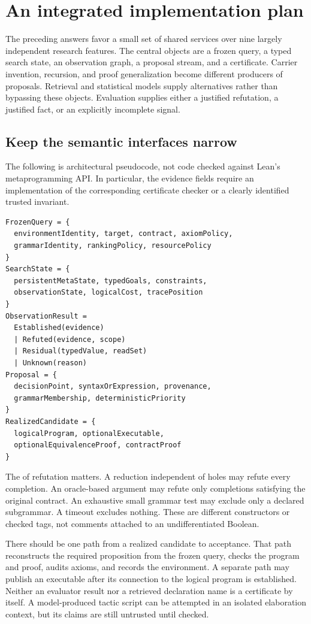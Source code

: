 \section{An integrated implementation plan}
\label{sec:plan}

The preceding answers favor a small set of shared services over nine largely independent research features. The central objects are a frozen query, a typed search state, an observation graph, a proposal stream, and a certificate. Carrier invention, recursion, and proof generalization become different producers of proposals. Retrieval and statistical models supply alternatives rather than bypassing these objects. Evaluation supplies either a justified refutation, a justified fact, or an explicitly incomplete signal.

\subsection{Keep the semantic interfaces narrow}

The following is architectural pseudocode, not code checked against Lean's metaprogramming API. In particular, the evidence fields require an implementation of the corresponding certificate checker or a clearly identified trusted invariant.
\begin{lstlisting}[basicstyle=\footnotesize\ttfamily]
FrozenQuery = {
  environmentIdentity, target, contract, axiomPolicy,
  grammarIdentity, rankingPolicy, resourcePolicy
}
SearchState = {
  persistentMetaState, typedGoals, constraints,
  observationState, logicalCost, tracePosition
}
ObservationResult =
  Established(evidence)
  | Refuted(evidence, scope)
  | Residual(typedValue, readSet)
  | Unknown(reason)
Proposal = {
  decisionPoint, syntaxOrExpression, provenance,
  grammarMembership, deterministicPriority
}
RealizedCandidate = {
  logicalProgram, optionalExecutable,
  optionalEquivalenceProof, contractProof
}
\end{lstlisting}

The  of refutation matters. A reduction independent of holes may refute every completion. An oracle-based argument may refute only completions satisfying the original contract. An exhaustive small grammar test may exclude only a declared subgrammar. A timeout excludes nothing. These are different constructors or checked tags, not comments attached to an undifferentiated Boolean.

There should be one path from a realized candidate to acceptance. That path reconstructs the required proposition from the frozen query, checks the program and proof, audits axioms, and records the environment. A separate path may publish an executable after its connection to the logical program is established. Neither an evaluator result nor a retrieved declaration name is a certificate by itself. A model-produced tactic script can be attempted in an isolated elaboration context, but its claims are still untrusted until checked.

